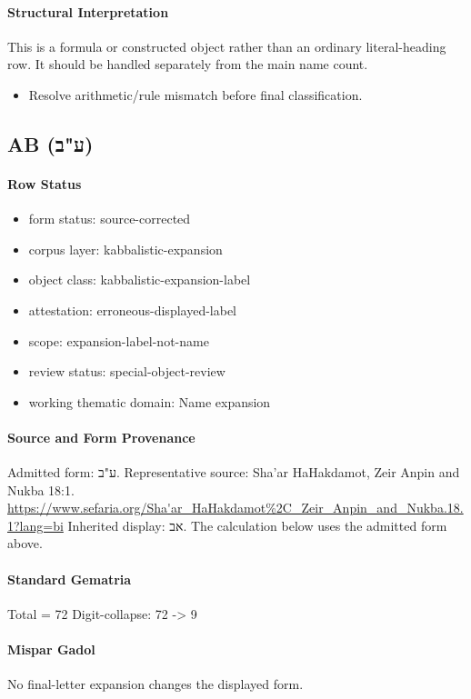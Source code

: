 \paragraph{Structural Interpretation}
This is a formula or constructed object rather than an ordinary literal-heading row. It should be handled separately from the main name count.

\begin{itemize}
\item Resolve arithmetic/rule mismatch before final classification.
\end{itemize}

\subsection{AB (ע"ב)}
\paragraph{Row Status}
\begin{itemize}
\item form status: source-corrected
\item corpus layer: kabbalistic-expansion
\item object class: kabbalistic-expansion-label
\item attestation: erroneous-displayed-label
\item scope: expansion-label-not-name
\item review status: special-object-review
\item working thematic domain: Name expansion
\end{itemize}
\paragraph{Source and Form Provenance}
Admitted form: ע"ב.
Representative source: Sha'ar HaHakdamot, Zeir Anpin and Nukba 18:1.
\url{https://www.sefaria.org/Sha'ar_HaHakdamot%2C_Zeir_Anpin_and_Nukba.18.1?lang=bi}
Inherited display: אב. The calculation below uses the admitted form above.
\paragraph{Standard Gematria}
Total = 72
Digit-collapse: 72 -> 9
\paragraph{Mispar Gadol}
No final-letter expansion changes the displayed form.

